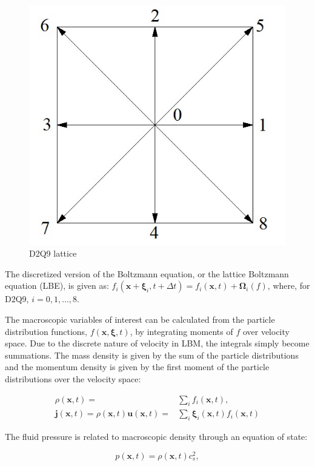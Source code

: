 \documentclass{article}
\newcommand{\pos}{\mathbf{x}}
\newcommand{\pvel}{\boldsymbol{\xi}}
\newcommand{\mvel}{\mathbf{u}}
\newcommand{\colop}{\boldsymbol{\Omega}}
\newcommand{\mmom}{\mathbf{j}}
\begin{document}
\begin{figure}
  \includegraphics[]{figs/d2q9}
  \caption{D2Q9 lattice}
  \label{fig:d2q9}
\end{figure}

The discretized version of the Boltzmann equation, or the lattice Boltzmann equation (LBE), is given as: $f_i(\pos + \pvel_i, t + \Delta t) = f_i(\pos, t) + \colop_i(f)$, where, for D2Q9, $i = 0, 1, ..., 8$.

The macroscopic variables of interest can be calculated from the particle distribution functions, $f(\pos, \pvel, t)$, by integrating moments of $f$ over velocity space.
Due to the discrete nature of velocity in LBM, the integrals simply become summations.
The mass density is given by the sum of the particle distributions and the momentum density is given by the first moment of the particle distributions over the velocity space:

\begin{align}
\label{eq:rho} \rho(\pos, t) =& \sum_{i} f_i(\pos, t), \\
\label{eq:mom} \mmom(\pos, t) = \rho(\pos, t) \mvel(\pos, t) =& \sum_{i} \pvel_i(\pos, t) f_i(\pos, t)
\end{align}

The fluid pressure is related to macroscopic density through an equation of state:

\begin{equation}
\label{eq:pres} p(\pos, t) = \rho(\pos, t) c_s^2,
\end{equation}
\end{document}
